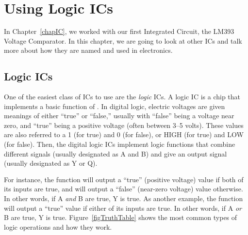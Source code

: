 \chapter{Using Logic ICs}
\label{chapLogicICs}


In Chapter~\ref{chapIC}, we worked with our first Integrated Circuit, the LM393 Voltage Comparator.  
In this chapter, we are going to look at other ICs and talk more about how they are named and used in electronics.

\section{Logic ICs}

One of the easiest class of ICs to use are the \emph{logic} ICs.  
A logic IC is a chip that implements a basic function of .
In digital logic, electric voltages are given meanings of either ``true'' or ``false,'' usually with ``false'' being a voltage near zero, and ``true'' being a positive voltage (often between 3--5 volts).
These values are also referred to a 1 (for true) and 0 (for false), or HIGH (for true) and LOW (for false).
Then, the digital logic ICs implement logic functions that combine different signals (usually designated as A and B) and give an output signal (usually designated as Y or Q).

For instance, the  function will output a ``true'' (positive voltage) value if both of its inputs are true, and will output a ``false'' (near-zero voltage) value otherwise.  
In other words, if A \emph{and} B are true, Y is true.
As another example, the  function will output a ``true'' value if either of its inputs are true.
In other words, if A \emph{or} B are true, Y is true.
Figure~\ref{figTruthTable} shows the most common types of logic operations and how they work.

